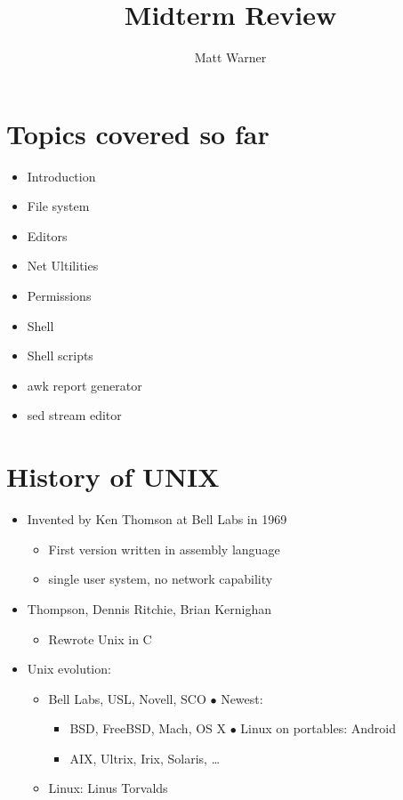 \documentclass{report}
\title{\Huge{Midterm Review}}
\author{\huge{Matt Warner}}
\date{\huge{}}
\begin{document}
  \maketitle
\section{Topics covered so far}
\begin{itemize}
  \item Introduction 
  \item File system
  \item Editors
  \item Net Ultilities
  \item Permissions
  \item Shell
  \item Shell scripts
  \item awk report generator
  \item sed stream editor
\end{itemize}
\section{History of UNIX}
\begin{itemize}
  \item Invented by Ken Thomson at Bell Labs in 1969 
    \begin{itemize}[label=$\bullet$]
      \item First version written in assembly language 
      \item single user system, no network capability
    \end{itemize}
  \item Thompson, Dennis Ritchie, Brian Kernighan
    \begin{itemize}[label=$\bullet$]
      \item Rewrote Unix in C 
    \end{itemize}
  \item Unix evolution:
    \begin{itemize}[label=$\bullet$]
      \item Bell Labs, USL, Novell, SCO  \hspace{30mm}$\bullet$ Newest:
        \begin{itemize}[label=$\bullet$]
          \item BSD, FreeBSD, Mach, OS X \hspace{30mm} $\bullet$ Linux on portables: Android
          \item AIX, Ultrix, Irix, Solaris, \ldots
        \end{itemize}
      \item Linux: Linus Torvalds
    \end{itemize}
\end{itemize}
\end{document}
